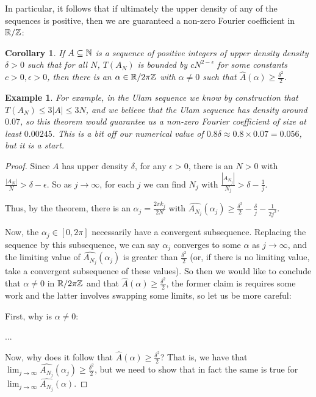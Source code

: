\documentclass{report}
\newtheorem{corollary}{Corollary}[theorem]
\newtheorem{example}{Example}
\theoremstyle{remark}
\numberwithin{equation}{section}
\begin{document}
In particular, it follows that if ultimately the upper density of any
of the \relevant sequences is positive, then we are guaranteed a
non-zero Fourier coefficient in $\mathbb{R}/\mathbb{Z}$:
{\color{red}
\begin{corollary}\label{thm:alpha}
  If $A \subseteq \mathbb{N}$ is a sequence of positive integers of upper
  density density $\delta > 0$ such that for all $N$, $T(A_N)$ is
  bounded by $c N^{2-\epsilon}$ for some constants
  $c > 0, \epsilon > 0$, then there is an $\alpha \in \mathbb{R}/2\pi\mathbb{Z}$ with
  $\alpha \neq 0$ such that
  $\widehat{A}(\alpha) \geq \frac{\delta^2}{2}$.
\end{corollary}

\begin{example}
  For example, in the Ulam sequence we know by construction that
  $T(A_N) \leq 3|A| \leq 3N$, and we believe that the Ulam sequence
  has density around $0.07$, so this theorem would guarantee us a
  non-zero Fourier coefficient of size at least $0.00245$.  This is a
  bit off our numerical value of
  $0.8\delta \approx 0.8 \times 0.07 = 0.056$, but it is a start.
\end{example}

\begin{proof}Since $A$ has upper density $\delta$, for any
  $\epsilon > 0$, there is an $N > 0$ with
  $\frac{|A_N|}{N} > \delta-\epsilon$.  So as $j \to \infty$, for each
  $j$ we can find $N_j$ with
  $\frac{|A_{N_j}|}{N_j} > \delta-\frac{1}{j}$.

  Thus, by the theorem, there is an $\alpha_j = \frac{2\pi k_j}{2N}$
  with
  $\widehat{A_{N_j}}(\alpha_j) \geq
  \frac{\delta^2}{2}-\frac{\delta}{j} - \frac{1}{2j^2}$.

  Now, the $\alpha_j \in [0,2\pi]$ necessarily have a convergent
  subsequence.  Replacing the sequence by this subsequence, we can say
  $\alpha_j$ converges to some $\alpha$ as $j \to \infty$, and the
  limiting value of $\widehat{A_{N_j}}(\alpha_j)$ is greater than
  $\frac{\delta^2}{2}$ (or, if there is no limiting value, take a
  convergent subsequence of these values).  So then we would like to
  conclude that $\alpha \neq 0$ in $\mathbb{R}/2\pi\mathbb{Z}$ and that
  $\widehat{A}(\alpha) \geq \frac{\delta^2}{2}$, the former claim is
  requires some work and the latter involves swapping some limits, so
  let us be more careful:

  First, why is $\alpha \neq 0$: 

  ...

  Now, why does it follow that
  $\widehat{A}(\alpha) \geq \frac{\delta^2}{2}$?  That is, we have
  that
  $\lim_{j \to \infty} \widehat{A_{N_j}}(\alpha_j) \geq
  \frac{\delta^2}{2}$, but we need to show that in fact the same is
  true for $\lim_{j \to \infty} \widehat{A_{N_j}}(\alpha)$.


\end{proof}}
\end{document}
